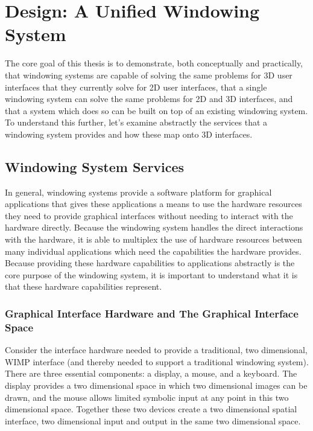 \chapter{Design: A Unified Windowing System}
\label{sec:design}
The core goal of this thesis is to demonstrate, both conceptually and practically, that windowing systems are capable of solving the same problems for 3D user interfaces that they currently solve for 2D user interfaces, that a single windowing system can solve the same problems for 2D and 3D interfaces, and that a system which does so can be built on top of an existing windowing system. To understand this further, let’s examine abstractly the services that a windowing system provides and how these map onto 3D interfaces.

\section{Windowing System Services}

In general, windowing systems provide a software platform for graphical applications that gives these applications a means to use the hardware resources they need to provide graphical interfaces without needing to interact with the hardware directly. Because the windowing system handles the direct interactions with the hardware, it is able to multiplex the use of hardware resources between many individual applications which need the capabilities the hardware provides. Because providing these hardware capabilities to applications abstractly is the core purpose of the windowing system, it is important to understand what it is that these hardware capabilities represent.

\subsection{Graphical Interface Hardware and The Graphical Interface Space}

Consider the interface hardware needed to provide a traditional, two dimensional, WIMP interface (and thereby needed to support a traditional windowing system). There are three essential components: a display, a mouse, and a keyboard. The display provides a two dimensional space in which two dimensional images can be drawn, and  the mouse allows limited symbolic input at any point in this two dimensional space. Together these two devices create a two dimensional spatial interface, two dimensional input and output in the same two dimensional space. 

